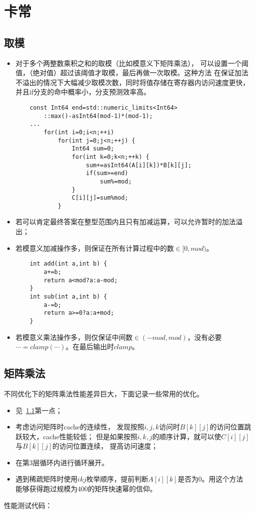 \section{卡常}
\subsection{取模}\label{mod}
\begin{itemize}
    \item 对于多个两整数乘积之和的取模（比如模意义下矩阵乘法），
    可以设置一个阈值，（绝对值）超过该阈值才取模，最后再做一次取模。这种方法
    在保证加法不溢出的情况下大幅减少取模次数，同时将值存储在寄存器内访问速度更快，
    并且if分支的命中概率小，分支预测效率高。
    \begin{lstlisting}
    const Int64 end=std::numeric_limits<Int64>
        ::max()-asInt64(mod-1)*(mod-1);
    ...
        for(int i=0;i<n;++i)
            for(int j=0;j<n;++j) {
                Int64 sum=0;
                for(int k=0;k<n;++k) {
                    sum+=asInt64(A[i][k])*B[k][j];
                    if(sum>=end)
                        sum%=mod;
                }
                C[i][j]=sum%mod;
            }
    \end{lstlisting}
    \item 若可以肯定最终答案在整型范围内且只有加减运算，可以允许暂时的加法溢出；
    \item 若模意义加减操作多，则保证在所有计算过程中的数$\in[0,mod)$。
    \begin{lstlisting}
    int add(int a,int b) {
        a+=b;
        return a<mod?a:a-mod;
    }
    int sub(int a,int b) {
        a-=b;
        return a>=0?a:a+mod;
    }
    \end{lstlisting}
    \item 若模意义乘法操作多，则仅保证中间数$\in (-mod,mod)$，没有必要
    $\cdots =clamp(\cdots)$。在最后输出时$clamp$。
\end{itemize}
\subsection{矩阵乘法}
不同优化下的矩阵乘法性能差异巨大，下面记录一些常用的优化。
\begin{itemize}
    \item 见~\ref{mod}第一点；
    \item 考虑访问矩阵时cache的连续性，
    发现按照$i,j,k$访问时$B[k][j]$的访问位置跳跃较大，cache性能较低；
    但是如果按照$i,k,j$的顺序计算，就可以使$C[i][j]$与$B[k][j]$的访问位置连续，
    提高访问速度；
    \item 在第3层循环内进行循环展开。
    \item 遇到稀疏矩阵时使用$ikj$枚举顺序，提前判断$A[i][k]$是否为0。用这个方法
    能够获得跑过规模为$400$的矩阵快速幂的信仰。
\end{itemize}
性能测试代码：


